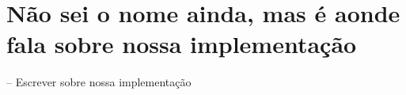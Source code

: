 \section{Não sei o nome ainda, mas é aonde fala sobre nossa implementação}
\label{sec:iotGateway}

-- Escrever sobre nossa implementação